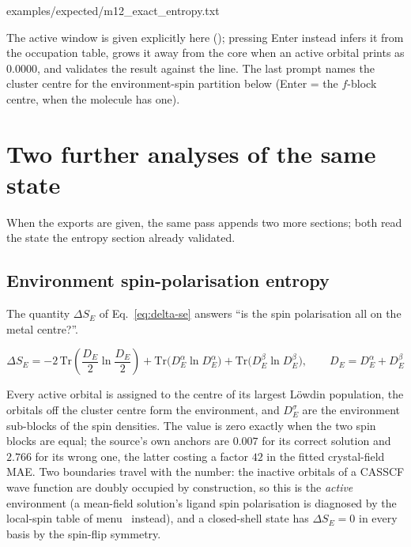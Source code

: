 
  {examples/expected/m12_exact_entropy.txt}

The active window is given explicitly here (); pressing Enter
instead infers it from the occupation table, grows it away from the core when
an active orbital prints as $0.0000$, and validates the result against the
 line. The last prompt names the cluster centre for the
environment-spin partition below (Enter = the $f$-block centre, when the
molecule has one).

\section{Two further analyses of the same state}

When the exports are given, the same pass appends two more sections; both read
the state the entropy section already validated.

\subsection*{Environment spin-polarisation entropy}

The quantity $\Delta S_E$ of Eq.~\eqref{eq:delta-se} answers ``is the spin
polarisation all on the metal centre?''.

\begin{equation}
\Delta S_E = -2\,\mathrm{Tr}\!\left(\frac{D_E}{2}\ln\frac{D_E}{2}\right)
  + \mathrm{Tr}\bigl(D_E^\alpha \ln D_E^\alpha\bigr)
  + \mathrm{Tr}\bigl(D_E^\beta \ln D_E^\beta\bigr),
\qquad D_E = D_E^\alpha + D_E^\beta
\label{eq:delta-se}
\end{equation}

Every active orbital is assigned to the centre of its largest L\"owdin
population, the orbitals off the cluster centre form the environment, and
$D_E^\sigma$ are the environment sub-blocks of the spin densities. The value
is zero exactly when the two spin blocks are equal; the source's own anchors
are $0.007$ for its correct solution and $2.766$ for its wrong one, the latter
costing a factor $42$ in the fitted crystal-field MAE. Two boundaries travel
with the number: the inactive orbitals of a CASSCF wave function are doubly
occupied by construction, so this is the \emph{active} environment (a
mean-field solution's ligand spin polarisation is diagnosed by the local-spin
table of menu~ instead), and a closed-shell state has $\Delta S_E =
0$ in every basis by the spin-flip symmetry.

